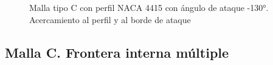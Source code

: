 \documentclass[letterpaper, openright, 12pt]{book}
\begin{document}
    \begin{figure}[htbp!]
        \centering
        \caption[Malla tipo C con perfil NACA4415 a -130\si{\degree}]{Malla tipo
          C con perfil NACA 4415 con ángulo de ataque -130\si{\degree}.
          Acercamiento al perfil y al borde de ataque}
        \label{fig:naca4415_c_-130}
    \end{figure}

   \subsection{Malla C. Frontera interna múltiple}
\end{document}
